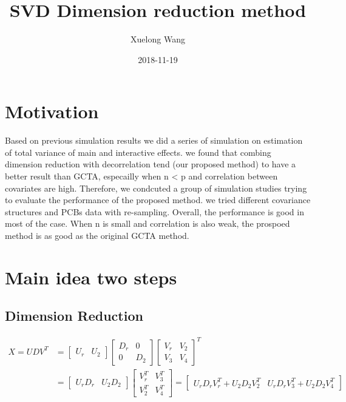 \documentclass[]{article}
\title{SVD Dimension reduction method}
\author{Xuelong Wang}
\date{2018-11-19}
\begin{document}
\maketitle

{
\setcounter{tocdepth}{2}
\tableofcontents
}
\section{Motivation}\label{motivation}

Based on previous simulation results we did a series of simulation on
estimation of total variance of main and interactive effects. we found
that combing dimension reduction with decorrelation tend (our proposed
method) to have a better result than GCTA, especailly when n \textless{}
p and correlation between covariates are high. Therefore, we condcuted a
group of simulation studies trying to evaluate the performance of the
proposed method. we tried different covariance structures and PCBs data
with re-sampling. Overall, the performance is good in most of the case.
When n is small and correlation is also weak, the prospoed method is as
good as the original GCTA method.

\section{Main idea two steps}\label{main-idea-two-steps}

\subsection{Dimension Reduction}\label{dimension-reduction}

\begin{align*}
  X = U D V^T &= \begin{bmatrix}
                      U_r & U_2
                      \end{bmatrix}
                      \begin{bmatrix}
                      D_r & 0\\
                      0 & D_2
                      \end{bmatrix}
                      \begin{bmatrix}
                      V_r & V_2\\
                      V_3 & V_4
                      \end{bmatrix}^T \\ 
              &= 
                      \begin{bmatrix}
                      U_rD_r & U_2D_2
                      \end{bmatrix}
                      \begin{bmatrix}
                      V_r^T & V_3^T\\
                      V_2^T & V_4^T
                      \end{bmatrix}
                      =
                      \begin{bmatrix}
                      U_rD_rV_r^T + U_2D_2V_2^T & U_rD_rV_3^T + U_2D_2 V_4^T
                      \end{bmatrix}
\end{align*}
\end{document}
